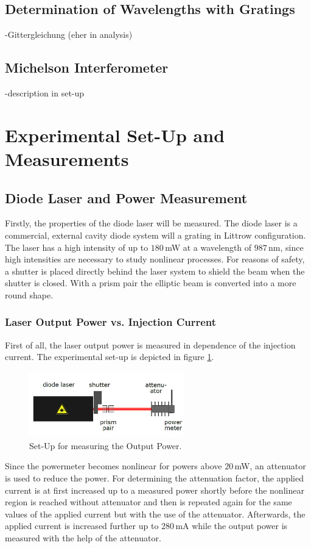 \documentclass[10pt, a4paper, notitlepage, DIV=15]{scrartcl}
\begin{document}
\subsection{Determination of Wavelengths with Gratings}
-Gittergleichung (eher in analysis)
\subsection{Michelson Interferometer}
-description in set-up
\section{Experimental Set-Up and Measurements}
\subsection{Diode Laser and Power Measurement}
Firstly, the properties of the diode laser will be measured. The diode laser is a commercial, external cavity diode system will a grating in Littrow configuration. The laser has a high intensity of up to $180\,$mW at a wavelength of $987\,$nm, since high intensities are necessary to study nonlinear processes. For reasons of safety, a shutter is placed directly behind the laser system to shield the beam when the shutter is closed. With a prism pair the elliptic beam is converted into a more round shape.
\subsubsection{Laser Output Power vs. Injection Current}
First of all, the laser output power is measured in dependence of the injection current. The experimental set-up is depicted in figure \ref{fig:power_fun}.
\begin{figure}[h]
	\centering
	\includegraphics[width=0.6\textwidth]{power_fun}
	\caption{Set-Up for measuring the Output Power. \cite{description}}
	\label{fig:power_fun}
\end{figure}
\newline
Since the powermeter becomes nonlinear for powers above $20\,$mW, an attenuator is used to reduce the power. For determining the attenuation factor, the applied current is at first increased up to a measured power shortly before the nonlinear region is reached without attenuator and then is repeated again for the same values of the applied current but with the use of the attenuator. \newline
Afterwards, the applied current is increased further up to $280\,$mA while the output power is measured with the help of the attenuator.
\end{document}
